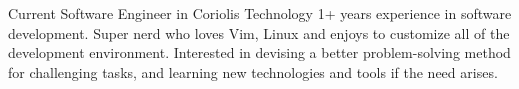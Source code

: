 

\begin{cvparagraph}

Current Software Engineer in Coriolis Technology 1+ years experience in software development. Super nerd who loves Vim, Linux and enjoys to customize all of the development environment. Interested in devising a better problem-solving method for challenging tasks, and learning new technologies and tools if the need arises.
\end{cvparagraph}
